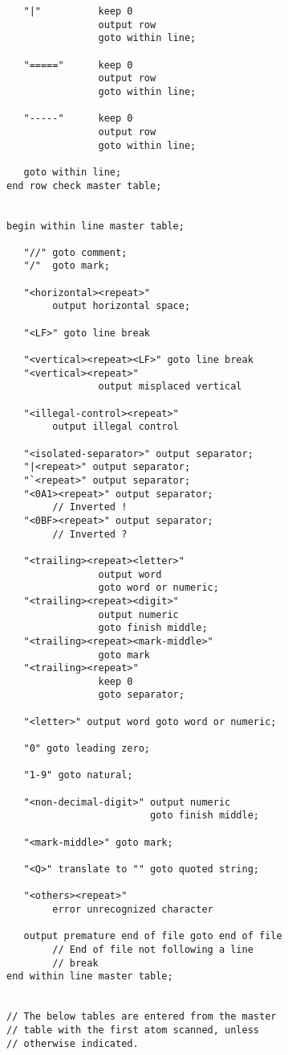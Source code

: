 \documentclass[12pt]{article}
\newenvironment{indpar}[1][0.3in]%
	{\begin{list}{}%
		     {\setlength{\itemsep}{0in}%
		      \setlength{\topsep}{0in}%
		      \setlength{\parsep}{1ex}%
		      \setlength{\labelwidth}{#1}%
		      \setlength{\leftmargin}{#1}%
		      \addtolength{\leftmargin}{\labelsep}}%
	 \item}%
	{\end{list}}
\begin{document}
\begin{indpar}
\begin{verbatim}
   "|"          keep 0
                output row
                goto within line;

   "====="      keep 0
                output row
                goto within line;

   "-----"      keep 0
                output row
                goto within line;

   goto within line;
end row check master table;


begin within line master table;

   "//" goto comment;
   "/"  goto mark;

   "<horizontal><repeat>"
        output horizontal space;

   "<LF>" goto line break

   "<vertical><repeat><LF>" goto line break
   "<vertical><repeat>"
                output misplaced vertical

   "<illegal-control><repeat>"
        output illegal control

   "<isolated-separator>" output separator;
   "|<repeat>" output separator;
   "`<repeat>" output separator;
   "<0A1><repeat>" output separator;
        // Inverted !
   "<0BF><repeat>" output separator;
        // Inverted ?

   "<trailing><repeat><letter>"
                output word
                goto word or numeric;
   "<trailing><repeat><digit>"
                output numeric
                goto finish middle;
   "<trailing><repeat><mark-middle>"
                goto mark
   "<trailing><repeat>"
                keep 0
                goto separator;

   "<letter>" output word goto word or numeric;

   "0" goto leading zero;

   "1-9" goto natural;

   "<non-decimal-digit>" output numeric
                         goto finish middle;

   "<mark-middle>" goto mark;

   "<Q>" translate to "" goto quoted string;

   "<others><repeat>"
        error unrecognized character

   output premature end of file goto end of file
        // End of file not following a line
        // break
end within line master table;


// The below tables are entered from the master
// table with the first atom scanned, unless
// otherwise indicated.


\end{verbatim}
\end{indpar}
\end{document}
